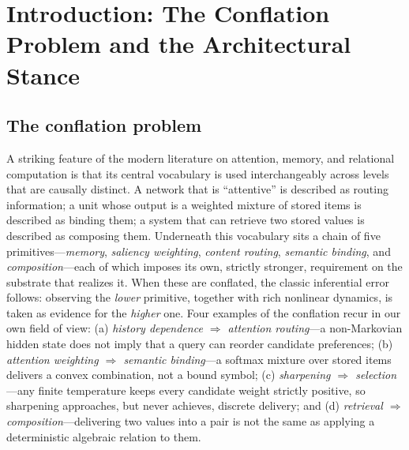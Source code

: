 \section{Introduction: The Conflation Problem and the Architectural Stance}
\label{sec:intro}

\subsection{The conflation problem}
\label{sec:conflation}

A striking feature of the modern literature on attention, memory, and
relational computation is that its central vocabulary is used
interchangeably across levels that are causally distinct. A network that is
``attentive'' is described as routing information; a unit whose output is a
weighted mixture of stored items is described as binding them; a system that
can retrieve two stored values is described as composing them. Underneath
this vocabulary sits a chain of five primitives---\emph{memory},
\emph{saliency weighting}, \emph{content routing}, \emph{semantic binding},
and \emph{composition}---each of which imposes its own, strictly stronger,
requirement on the substrate that realizes it. When these are conflated, the
classic inferential error follows: observing the \emph{lower} primitive,
together with rich nonlinear dynamics, is taken as evidence for the
\emph{higher} one. Four examples of the conflation recur in our own field of
view: (a) \emph{history dependence $\Rightarrow$ attention routing}---a
non-Markovian hidden state does not imply that a query can reorder candidate
preferences; (b) \emph{attention weighting $\Rightarrow$ semantic
binding}---a softmax mixture over stored items delivers a convex combination,
not a bound symbol; (c) \emph{sharpening $\Rightarrow$ selection}---any finite
temperature keeps every candidate weight strictly positive, so sharpening
approaches, but never achieves, discrete delivery; and (d) \emph{retrieval
$\Rightarrow$ composition}---delivering two values into a pair is not the
same as applying a deterministic algebraic relation to them.

